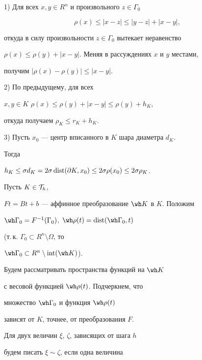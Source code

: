 \begin{pf}


1) Для всех $x,y \in R^n$ и произвольного $z\in \Gamma_0$ 


$$


\rho(x) \le |x-z| \le |y-z|+|x-y|,


$$


откуда в силу произвольности $z \in \Gamma_0$ вытекает неравенство 


$\rho(x) \le \rho(y) + |x-y|$. Меняя в рассуждениях $x$ и $y$ местами, 


получим $|\rho(x)-\rho(y)| \le |x-y|$.





2) По предыдущему, для всех


$x,y \in K$ $\rho(x) \le \rho(y) +|x-y| \le \rho(y) +h_K$, 


откуда получаем $\rho_K \le r_K+h_K$.


 


3) Пусть $x_0$ --- центр вписанного в $K$ шара диаметра $d_K$. 


Тогда


$h_K \le \sigma d_K =2\sigma \dist(\partial K,x_0) \le 2\sigma \rho(x_0) 


\le 2 \sigma \rho_K$. 


\end{pf}





Пусть $K \in {\cal T}_h$, 


$Ft=Bt+b$ --- аффинное преобразование $\wh K$ в $K$. Положим 


$\wh \Gamma_0=F^{-1}(\Gamma_0)$, $\wh \rho(t)=\dist(\wh \Gamma_0,t)$ 


(т.\,к. $\Gamma_0 \subset R^n \setminus \Omega$, то 


$\wh \Gamma_0 \subset R^n \setminus \Int(\wh K)$). 


Будем рассматривать пространства функций на $\wh K$ 


с весовой функцией $\wh \rho(t)$. Подчеркнем, что 


множество $\wh \Gamma_0$ и функция $\wh \rho(t)$ 


зависят от $K$, точнее, от преобразования $F$. 


Для двух величин $\xi$, $\zeta$, зависящих от шага $h$ 


будем писать $\xi \sim \zeta$, если одна величина 


